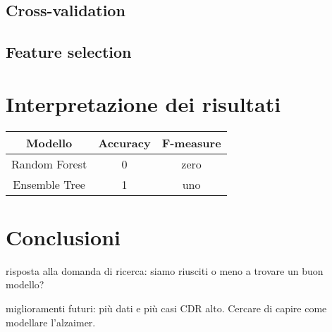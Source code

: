 \documentclass[10pt, a4paper,openany]{article}
\begin{document}
\begin{multicols}{2}
\subsection{Cross-validation}
\subsection{Feature selection}

\section{Interpretazione dei risultati}

\begin{tabular}{ccc}
	\hline
	Modello         & Accuracy        & F-measure       \\
	\hline
	Random Forest          & 0     & zero          \\
	Ensemble Tree         & 1     & uno           \\
	\hline
\end{tabular}
\section{Conclusioni}
risposta alla domanda di ricerca: siamo riusciti o meno a trovare un buon modello?

miglioramenti futuri: più dati e più casi CDR alto. Cercare di capire come modellare l'alzaimer.
\end{multicols}
\end{document}
